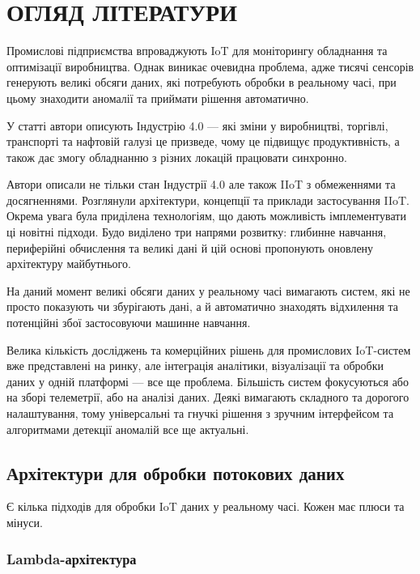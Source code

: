 \chapter{ОГЛЯД ЛІТЕРАТУРИ}

Промислові підприємства впроваджують IoT для моніторингу обладнання та оптимізації виробництва. Однак виникає очевидна проблема, адже тисячі сенсорів генерують великі обсяги даних, які потребують обробки в реальному часі, при цьому знаходити аномалії та приймати рішення автоматично.

У статті \cite{alabadi2022industrial} автори описують Індустрію 4.0 --- які зміни у виробництві, торгівлі, транспорті та нафтовій галузі це призведе, чому це підвищує продуктивність, а також дає змогу обладнанню з різних локацій працювати синхронно.

Автори описали не тільки стан Індустрії 4.0 але також IIoT з обмеженнями та досягненнями. Розглянули архітектури, концепції та приклади застосування IIoT. Окрема увага була приділена технологіям, що дають можливість імплементувати ці новітні підходи. Будо виділено три напрями розвитку: глибинне навчання, периферійні обчислення та великі дані й цій основі пропонують оновлену архітектуру майбутнього.

На даний момент великі обсяги даних у реальному часі вимагають систем, які не просто показують чи збурігають дані, а й автоматично знаходять відхилення та потенційні збої застосовуючи машинне навчання.

Велика кількість досліджень та комерційних рішень для промислових IoT-систем вже представлені на ринку, але інтеграція аналітики, візуалізації та обробки даних у одній платформі --- все ще проблема. Більшість систем фокусуються або на зборі телеметрії, або на аналізі даних. Деякі вимагають складного та дорогого налаштування, тому універсальні та гнучкі рішення з зручним інтерфейсом та алгоритмами детекції аномалій все ще актуальні.

\section{Архітектури для обробки потокових даних}

Є кілька підходів для обробки IoT даних у реальному часі. Кожен має плюси та мінуси.

\subsection{Lambda-архітектура}

